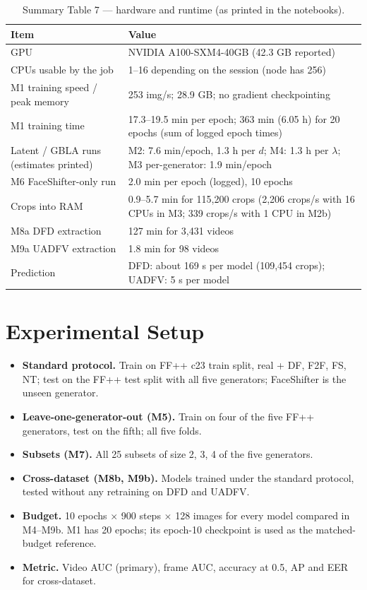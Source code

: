 \documentclass[10pt,a4paper]{article}
\begin{document}
\begin{table}[H]\centering\small
\caption{Summary Table 7 --- hardware and runtime (as printed in the notebooks).}\label{tab:runtime}
\begin{tabularx}{\linewidth}{@{}L{5.2cm}Y@{}}
\toprule
Item & Value\\
\midrule
GPU & NVIDIA A100-SXM4-40GB (42.3 GB reported)\\
CPUs usable by the job & 1--16 depending on the session (node has 256)\\
M1 training speed / peak memory & 253 img/s; 28.9 GB; no gradient checkpointing\\
M1 training time & 17.3--19.5 min per epoch; 363 min (6.05 h) for 20 epochs (sum of logged epoch times)\\
Latent / GBLA runs (estimates printed) & M2: 7.6 min/epoch, 1.3 h per \(d\); M4: 1.3 h per \(\lambda\); M3 per-generator: 1.9 min/epoch\\
M6 FaceShifter-only run & 2.0 min per epoch (logged), 10 epochs\\
Crops into RAM & 0.9--5.7 min for 115,200 crops (2,206 crops/s with 16 CPUs in M3; 339 crops/s with 1 CPU in M2b)\\
M8a DFD extraction & 127 min for 3,431 videos\\
M9a UADFV extraction & 1.8 min for 98 videos\\
Prediction & DFD: about 169 s per model (109,454 crops); UADFV: 5 s per model\\
\bottomrule
\end{tabularx}
\end{table}

\section{Experimental Setup}\label{sec:setup}
\begin{itemize}
\item \textbf{Standard protocol.} Train on FF++ c23 train split, real + DF, F2F, FS, NT; test on the
FF++ test split with all five generators; FaceShifter is the unseen generator.
\item \textbf{Leave-one-generator-out (M5).} Train on four of the five FF++ generators, test on the
fifth; all five folds.
\item \textbf{Subsets (M7).} All 25 subsets of size 2, 3, 4 of the five generators.
\item \textbf{Cross-dataset (M8b, M9b).} Models trained under the standard protocol, tested without
any retraining on DFD and UADFV.
\item \textbf{Budget.} 10 epochs \(\times\) 900 steps \(\times\) 128 images for every model compared in
M4--M9b. M1 has 20 epochs; its epoch-10 checkpoint is used as the matched-budget reference.
\item \textbf{Metric.} Video AUC (primary), frame AUC, accuracy at 0.5, AP and EER for cross-dataset.
\end{itemize}
\end{document}
